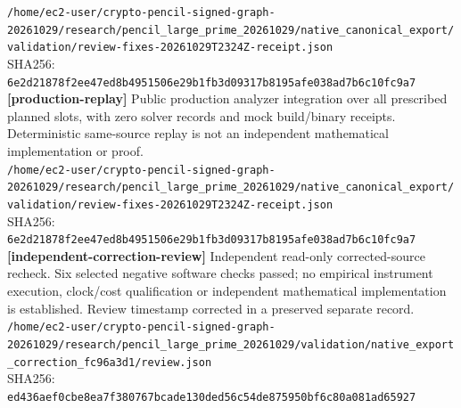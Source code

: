 \documentclass[11pt]{article}
\begin{document}
\texttt{/\allowbreak{}home/\allowbreak{}ec2-user/\allowbreak{}crypto-pencil-signed-graph-20261029/\allowbreak{}research/\allowbreak{}pencil\_large\_prime\_20261029/\allowbreak{}native\_canonical\_export/\allowbreak{}validation/\allowbreak{}review-fixes-20261029T2324Z-receipt.json}\\
SHA256: \texttt{6e2d21878f2ee47ed8b4951506e29b1fb3d09317b8195afe038ad7b6c10fc9a7}\\
\textbf{[production-replay]} Public production analyzer integration over all prescribed planned slots, with zero solver records and mock build/binary receipts. Deterministic same-source replay is not an independent mathematical implementation or proof.\\
\texttt{/\allowbreak{}home/\allowbreak{}ec2-user/\allowbreak{}crypto-pencil-signed-graph-20261029/\allowbreak{}research/\allowbreak{}pencil\_large\_prime\_20261029/\allowbreak{}native\_canonical\_export/\allowbreak{}validation/\allowbreak{}review-fixes-20261029T2324Z-receipt.json}\\
SHA256: \texttt{6e2d21878f2ee47ed8b4951506e29b1fb3d09317b8195afe038ad7b6c10fc9a7}\\
\textbf{[independent-correction-review]} Independent read-only corrected-source recheck. Six selected negative software checks passed; no empirical instrument execution, clock/cost qualification or independent mathematical implementation is established. Review timestamp corrected in a preserved separate record.\\
\texttt{/\allowbreak{}home/\allowbreak{}ec2-user/\allowbreak{}crypto-pencil-signed-graph-20261029/\allowbreak{}research/\allowbreak{}pencil\_large\_prime\_20261029/\allowbreak{}validation/\allowbreak{}native\_export\_correction\_fc96a3d1/\allowbreak{}review.json}\\
SHA256: \texttt{ed436aef0cbe8ea7f380767bcade130ded56c54de875950bf6c80a081ad65927}\\
\end{document}
